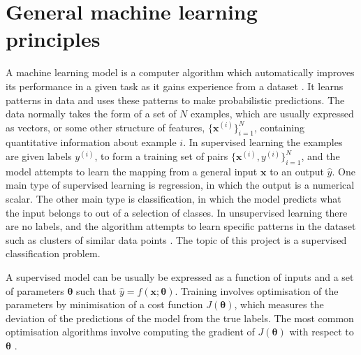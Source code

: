 \documentclass[12pt]{article}
\begin{document}
\section{General machine learning principles}
A machine learning model is a computer algorithm which automatically improves its performance in a given task as it gains experience from a dataset \cite{Goodfellow16}. It learns patterns in data and uses these patterns to make probabilistic predictions. The data normally takes the form of a set of $N$ examples, which are usually expressed as vectors, or some other structure of features, $\{\bm{x}^{(i)}\}_{i=1}^N$, containing quantitative information about example $i$. In supervised learning the examples are given labels $y^{(i)}$, to form a training set of pairs $\{\bm{x}^{(i)}, y^{(i)}\}_{i=1}^N$, and the model attempts to learn the mapping from a general input $\bm{x}$ to an output $\hat{y}$. One main type of supervised learning is regression, in which the output is a numerical scalar. The other main type is classification, in which the model predicts what the input belongs to out of a selection of classes. In unsupervised learning there are no labels, and the algorithm attempts to learn specific patterns in the dataset such as clusters of similar data points \cite{Murphy12}. The topic of this project is a supervised classification problem.

A supervised model can be usually be expressed as a function of inputs and a set of parameters $\boldsymbol\theta$ such that $\hat{y}=f(\bm{x};\boldsymbol\theta)$. Training involves optimisation of the parameters by minimisation of a cost function $J(\boldsymbol\theta)$, which measures the deviation of the predictions of the model from the true labels. The most common optimisation algorithms involve computing the gradient of $J(\boldsymbol\theta)$ with respect to $\boldsymbol\theta$ \cite{Goodfellow16}. 
\end{document}
